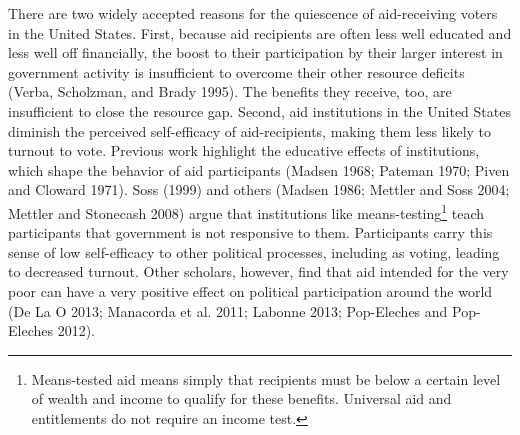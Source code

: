 \documentclass[12pt]{paper}
\begin{document}
There are two widely accepted reasons for the quiescence of aid-receiving voters in the United States. First, because aid recipients are often less well educated and less well off financially, the boost to their participation by their larger interest in government activity is insufficient to overcome their other resource deficits (Verba, Scholzman, and Brady 1995). The benefits they receive, too, are insufficient to close the resource gap. Second, aid institutions in the United States diminish the perceived self-efficacy of aid-recipients, making them less likely to turnout to vote. Previous work highlight the educative effects of institutions, which shape the behavior of aid participants (Madsen 1968; Pateman 1970; Piven and Cloward 1971). Soss (1999) and others (Madsen 1986; Mettler and Soss 2004; Mettler and Stonecash 2008) argue that institutions like means-testing\footnote{Means-tested aid means simply that recipients must be below a certain level of wealth and income to qualify for these benefits. Universal aid and entitlements do not require an income test.} teach participants that government is not responsive to them. Participants carry this sense of low self-efficacy to other political processes, including as voting, leading to decreased turnout. Other scholars, however, find that aid intended for the very poor can have a very positive effect on political participation around the world (De La O 2013; Manacorda et al. 2011; Labonne 2013; Pop-Eleches and Pop-Eleches 2012).
\end{document}
